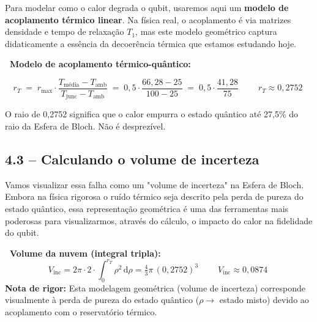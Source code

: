 \begin{fala}
Para modelar como o calor degrada o qubit, usaremos aqui um \textbf{modelo de acoplamento térmico linear}. Na física real, o acoplamento é via matrizes densidade e tempo de relaxação $T_1$, mas este modelo geométrico captura didaticamente a essência da decoerência térmica que estamos estudando hoje.
\end{fala}

\begin{mathblock}
\textbf{\color{corMath}\faSuperscript\ Modelo de acoplamento térmico-quântico:}

\[
  r_T
  \;=\;
  r_{\max}
  \cdot
  \frac{T_{\text{média}} - T_{\text{amb}}}{T_{\text{junc}} - T_{\text{amb}}}
  \;=\;
  0{,}5 \cdot \frac{66{,}28 - 25}{100 - 25}
  \;=\;
  0{,}5 \cdot \frac{41{,}28}{75}
  \qquad
  \boxed{\;r_T \approx 0{,}2752\;}
\]
\end{mathblock}

\begin{fala}
O raio de 0,2752 significa que o calor empurra o estado quântico até 27,5\%
do raio da Esfera de Bloch. Não é desprezível.
\end{fala}

\subsection{4.3 -- Calculando o volume de incerteza}

\begin{fala}
Vamos visualizar essa falha como um "volume de incerteza" na Esfera de Bloch. Embora na física rigorosa o ruído térmico seja descrito pela perda de pureza do estado quântico, essa representação geométrica é uma das ferramentas mais poderosas para visualizarmos, através do cálculo, o impacto do calor na fidelidade do qubit.
\end{fala}

\begin{mathblock}
\textbf{\color{corMath}\faSuperscript\ Volume da nuvem (integral tripla):}
\[
  V_{\text{inc}}
  = 2\pi \cdot 2 \cdot \int_0^{r_T}\rho^2\,\mathrm{d}\rho
  = \tfrac{4}{3}\pi\,(0{,}2752)^3
  \qquad
  \boxed{\;V_{\text{inc}} \approx 0{,}0874\;}
\]
{\small \textbf{Nota de rigor:} Esta modelagem geométrica (volume de incerteza) 
corresponde visualmente à perda de pureza do estado quântico ($\rho \to$ estado misto) 
devido ao acoplamento com o reservatório térmico.}
\end{mathblock}

